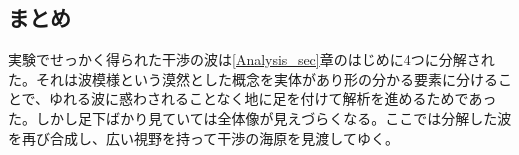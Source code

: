 \subsection{まとめ}
実験でせっかく得られた干渉の波は\ref{Analysis_sec}章のはじめに4つに分解された。それは波模様という漠然とした概念を実体があり形の分かる要素に分けることで、ゆれる波に惑わされることなく地に足を付けて解析を進めるためであった。しかし足下ばかり見ていては全体像が見えづらくなる。ここでは分解した波を再び合成し、広い視野を持って干渉の海原を見渡してゆく。








